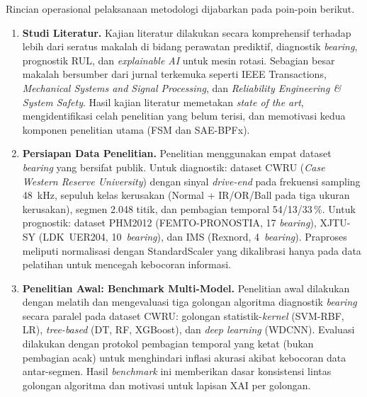{\color{blue}Rincian operasional pelaksanaan metodologi dijabarkan
pada poin-poin berikut.}

\begin{enumerate}

  \item \textbf{Studi Literatur.}
        Kajian literatur dilakukan secara komprehensif terhadap lebih dari
        seratus makalah di bidang perawatan prediktif, diagnostik
        \emph{bearing}, prognostik RUL, dan \emph{explainable AI} untuk
        mesin rotasi.
        Sebagian besar makalah bersumber dari jurnal terkemuka seperti
        IEEE Transactions, \emph{Mechanical Systems and Signal Processing},
        dan \emph{Reliability Engineering \& System Safety}.
        Hasil kajian literatur memetakan \emph{state of the art},
        mengidentifikasi celah penelitian yang belum terisi, dan
        memotivasi {\color{blue}kedua komponen} penelitian utama (FSM dan SAE-BPFx).

  \item \textbf{Persiapan Data Penelitian.}
        Penelitian menggunakan empat dataset \emph{bearing} yang bersifat
        publik.
        Untuk diagnostik: dataset CWRU (\emph{Case Western Reserve
        University}) dengan sinyal \emph{drive-end} pada frekuensi sampling
        48~kHz, sepuluh kelas kerusakan (Normal + IR/OR/Ball pada tiga
        ukuran kerusakan), segmen 2.048 titik, dan pembagian temporal
        54/13/33\,\%.
        Untuk prognostik: dataset PHM2012 (FEMTO-PRONOSTIA, 17
        \emph{bearing}), XJTU-SY (LDK~UER204, 10~\emph{bearing}), dan
        IMS (Rexnord, 4~\emph{bearing}).
        Praproses meliputi normalisasi dengan StandardScaler yang
        dikalibrasi hanya pada data pelatihan untuk mencegah kebocoran
        informasi.

  \item \textbf{Penelitian Awal: Benchmark Multi-Model.}
        Penelitian awal dilakukan dengan melatih dan mengevaluasi tiga
        golongan algoritma diagnostik \emph{bearing} secara paralel pada
        dataset CWRU: golongan statistik-\emph{kernel} (SVM-RBF, LR),
        \emph{tree-based} (DT, RF, XGBoost), dan \emph{deep learning}
        (WDCNN).
        Evaluasi dilakukan dengan protokol pembagian temporal yang ketat
        (bukan pembagian acak) untuk menghindari inflasi akurasi akibat
        kebocoran data antar-segmen.
        Hasil \emph{benchmark} ini memberikan dasar konsistensi lintas
        golongan algoritma dan motivasi untuk lapisan XAI per golongan.


\end{enumerate}
